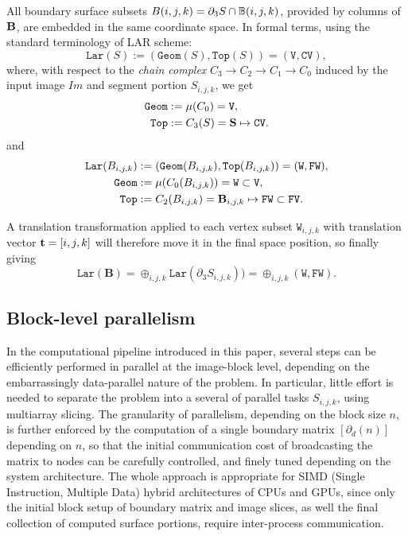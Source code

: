 All boundary surface subsets $B(i,j,k) = \partial_3 S \cap \mathbb{B}(i,j,k)$, provided by  columns of ${\bf B}$, are embedded in the same coordinate space. In formal terms, using the standard terminology of LAR scheme: 
\[
\texttt{Lar}(S) := (\texttt{Geom}(S), \texttt{Top}(S)) = (\texttt{V}, \texttt{CV}),
\]
where, with respect to the \emph{chain complex} $C_3\to C_2\to C_1\to C_0$ induced by the input image $Im$ and segment portion $S_{i,j,k}$, we get
\begin{align}
\texttt{Geom} &:= \mu(C_0) = \texttt{V},
\\
\texttt{Top} &:= C_3(S) = {\bf S} \mapsto \texttt{CV}.
\end{align}
and
\begin{align}
\texttt{Lar}(B_{i,j,k}) &:= (\texttt{Geom}(B_{i,j,k}), \texttt{Top}(B_{i,j,k})) = (\texttt{W}, \texttt{FW}),
\\
\texttt{Geom} &:= \mu(C_0(B_{i,j,k})) = \texttt{W} \subset \texttt{V},
\\
\texttt{Top} &:= C_2(B_{i,j,k}) = {\bf \textbf{B}}_{i,j,k} \mapsto \texttt{FW} \subset \texttt{FV}.
\end{align}


A translation transformation applied to each vertex subset $\texttt{W}_{i,j,k}$ with translation  vector ${\bf t} = [i,j,k]$ will therefore move it in the final space position, so finally giving
\[
\texttt{Lar}(\textbf{B}) = \oplus_{i,j,k}\texttt{Lar}(\partial_3 S_{i,j,k})) = \oplus_{i,j,k}(\texttt{W}, \texttt{FW}) .
\]


\subsection{Block-level parallelism}\label{sec:block-parallelism}
In the computational pipeline introduced in this paper, several steps can be efficiently performed in parallel at the image-block level, depending on the embarrassingly data-parallel nature of the problem. In particular, little effort is needed to separate the problem into a several of parallel tasks $S_{i,j,k}$, using multiarray slicing. The granularity of parallelism, depending on the block size $n$, is further enforced by the computation of a single boundary matrix $[\partial_d(n)]$ depending on $n$, so that the initial communication cost of broadcasting the matrix to nodes can be carefully controlled, and finely tuned depending on the system architecture. The whole approach is appropriate  for SIMD (Single Instruction, Multiple Data) hybrid architectures of CPUs and GPUs, since only the initial block setup of boundary matrix and image slices, as well the final collection of computed surface portions, require inter-process communication.